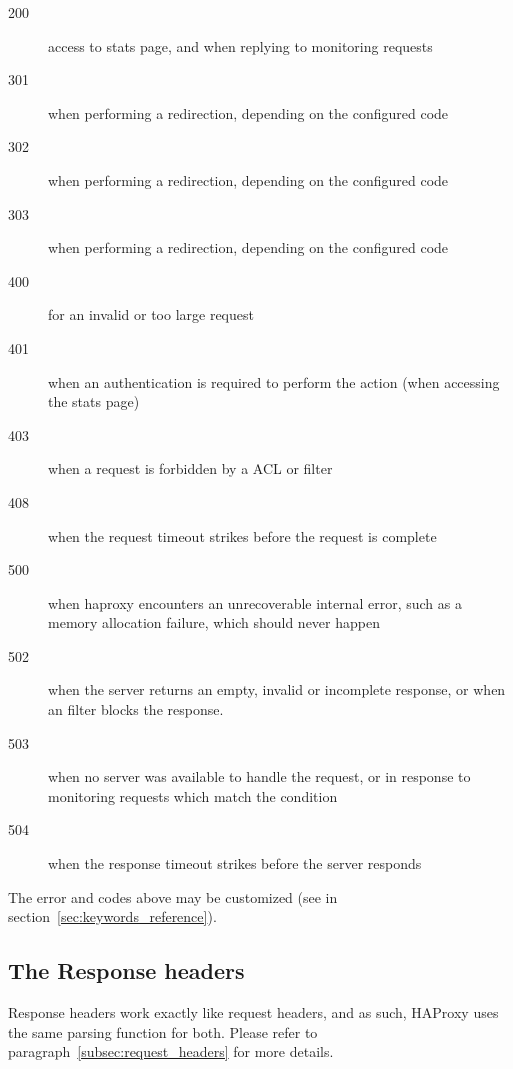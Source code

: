 \begin{description}
\item[200] access to stats page, and when replying to monitoring requests
\item[301] when performing a redirection, depending on the configured code
\item[302] when performing a redirection, depending on the configured code
\item[303] when performing a redirection, depending on the configured code
\item[400] for an invalid or too large request
\item[401] when an authentication is required to perform the action (when
        accessing the stats page)
\item[403] when a request is forbidden by a  ACL or  filter
\item[408] when the request timeout strikes before the request is complete
\item[500] when haproxy encounters an unrecoverable internal error, such as a
        memory allocation failure, which should never happen
\item[502] when the server returns an empty, invalid or incomplete response, or
        when an  filter blocks the response.
\item[503] when no server was available to handle the request, or in response to
        monitoring requests which match the  condition
\item[504] when the response timeout strikes before the server responds
\end{description}

The error  and  codes above may be customized (see  in section~\ref{sec:keywords_reference}).

\subsection{The Response headers}
\label{subsec:response_header}

Response headers work exactly like request headers, and as such, HAProxy uses
the same parsing function for both. Please refer to paragraph~\ref{subsec:request_headers} for more
details.
